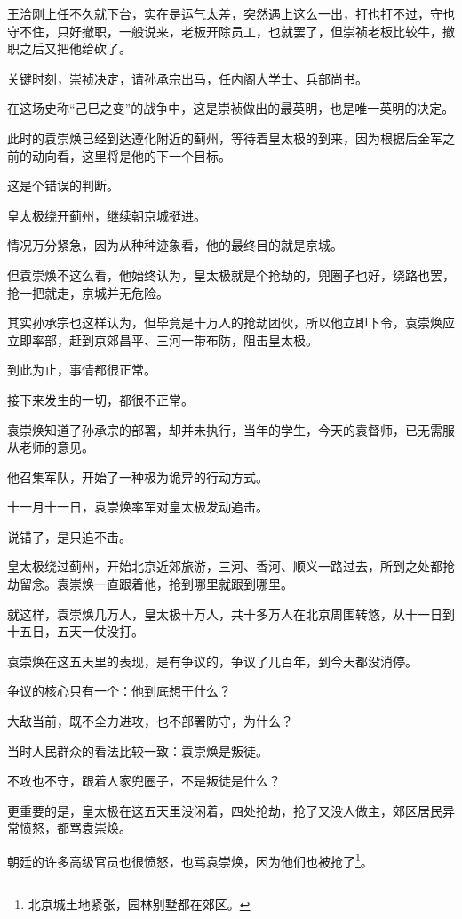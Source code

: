 \begin{multicols}{\theparacolNo}
		王洽刚上任不久就下台，实在是运气太差，突然遇上这么一出，打也打不过，守也守不住，只好撤职，一般说来，老板开除员工，也就罢了，但崇祯老板比较牛，撤职之后又把他给砍了。

		关键时刻，崇祯决定，请孙承宗出马，任内阁大学士、兵部尚书。

		在这场史称“己巳之变”的战争中，这是崇祯做出的最英明，也是唯一英明的决定。

		此时的袁崇焕已经到达遵化附近的蓟州，等待着皇太极的到来，因为根据后金军之前的动向看，这里将是他的下一个目标。

		这是个错误的判断。

		皇太极绕开蓟州，继续朝京城挺进。

		情况万分紧急，因为从种种迹象看，他的最终目的就是京城。

		但袁崇焕不这么看，他始终认为，皇太极就是个抢劫的，兜圈子也好，绕路也罢，抢一把就走，京城并无危险。

		其实孙承宗也这样认为，但毕竟是十万人的抢劫团伙，所以他立即下令，袁崇焕应立即率部，赶到京郊昌平、三河一带布防，阻击皇太极。

		到此为止，事情都很正常。

		接下来发生的一切，都很不正常。

		袁崇焕知道了孙承宗的部署，却并未执行，当年的学生，今天的袁督师，已无需服从老师的意见。

		他召集军队，开始了一种极为诡异的行动方式。

		十一月十一日，袁崇焕率军对皇太极发动追击。

		说错了，是只追不击。

		皇太极绕过蓟州，开始北京近郊旅游，三河、香河、顺义一路过去，所到之处都抢劫留念。袁崇焕一直跟着他，抢到哪里就跟到哪里。

		就这样，袁崇焕几万人，皇太极十万人，共十多万人在北京周围转悠，从十一日到十五日，五天一仗没打。

		袁崇焕在这五天里的表现，是有争议的，争议了几百年，到今天都没消停。

		争议的核心只有一个：他到底想干什么？

		大敌当前，既不全力进攻，也不部署防守，为什么？

		当时人民群众的看法比较一致：袁崇焕是叛徒。

		不攻也不守，跟着人家兜圈子，不是叛徒是什么？

		更重要的是，皇太极在这五天里没闲着，四处抢劫，抢了又没人做主，郊区居民异常愤怒，都骂袁崇焕。

		朝廷的许多高级官员也很愤怒，也骂袁崇焕，因为他们也被抢了\footnote{北京城土地紧张，园林别墅都在郊区。}。


\end{multicols}
